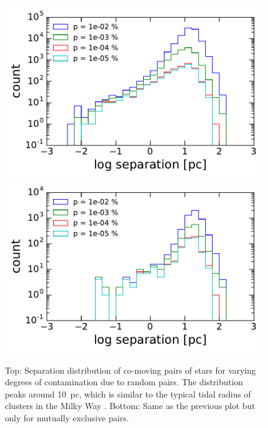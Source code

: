 \documentclass[manuscript, letterpaper]{aastex6}
\begin{document}
\begin{figure}[p]
  \begin{center}
    \includegraphics[width=\textwidth]{figures/hist_separation.pdf}
    \includegraphics[width=\textwidth]{figures/hist_separation_mutexc.pdf}
  \end{center}
  \caption{%
    Top: Separation distribution of co-moving pairs of stars for varying degrees
    of contamination due to random pairs. The distribution peaks around 10~pc,
    which is similar to the typical tidal radius of clusters in the Milky Way
    \citep{Kharchenko:2013aa}.
    Bottom: Same as the previous plot but only for mutually exclusive pairs.
    \label{fig:hist_separation}}
\end{figure}
\end{document}
